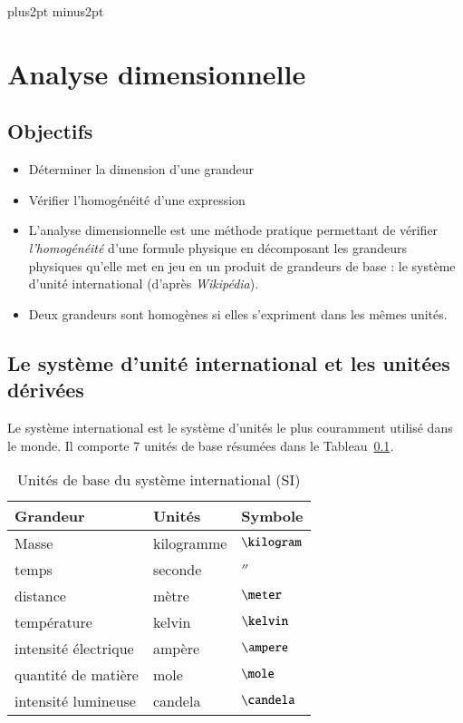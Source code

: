 \documentclass[12pt]{book}
\begin{document}
\def\author{Théo Tassin}
\def\title{L2 STEP - Électromagnétisme}
\parskip 10pt plus2pt minus2pt
\chapter*{Analyse dimensionnelle}
\section*{Objectifs}
\begin{itemize}
	\item Déterminer la dimension d'une grandeur
	\item Vérifier l'homogénéité d'une expression
\end{itemize}

\begin{defn}
	\begin{itemize}
		\item L'analyse dimensionnelle est une méthode 
		  pratique permettant de 
		  vérifier \emph{l'homogénéité} d'une formule physique en décomposant les 
		  grandeurs physiques qu'elle met en jeu en un produit de grandeurs 
		  de base : le système d'unité international 
		  (d'après \textit{Wikipédia}).
		 \item Deux grandeurs sont homogènes si elles s'expriment dans les
		   mêmes unités.
	\end{itemize}
\end{defn}

\section{Le système d'unité international et les unitées dérivées}
Le système international est le système d'unités le plus couramment utilisé dans 
le monde. Il comporte 7 unités de base résumées dans le Tableau~\ref{usi}.

\begin{table}[ht!]
	\centering
	\caption{Unités de base du système international (SI)}
	\begin{tabular}{lll}
	\textbf{Grandeur} & \textbf{Unités} & \textbf{Symbole} \\ \hline
	Masse & kilogramme & $\kilogram$ \\ 
	temps & seconde & $\second$ \\
	distance & mètre & $\meter$ \\
	température & kelvin & $\kelvin$ \\
	intensité électrique & ampère & $\ampere$ \\
	quantité de matière & mole & $\mole$ \\
	intensité lumineuse & candela & $\candela$
	\end{tabular}
	\label{usi}
\end{table}
\end{document}
